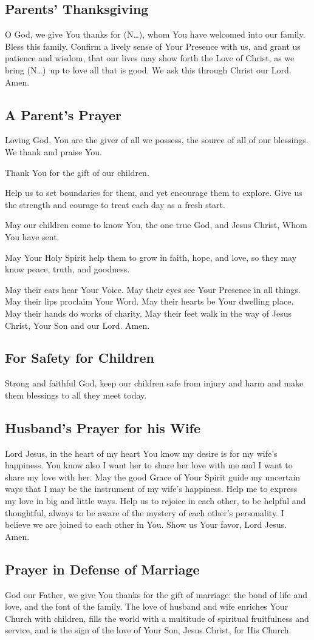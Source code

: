 \documentclass[12pt]{article}
\newcommand{\prayertitle}[1]{\subsection{#1}}
\newcommand{\insertname}{(N\dots)\xspace}
\begin{document}
\prayertitle{Parents' Thanksgiving}
O God, we give You thanks for \insertname, whom You have welcomed into our family.
Bless this family.
Confirm a lively sense of Your Presence with us, and grant us patience and wisdom, that our lives may show forth the Love of Christ, as we bring \insertname\ up to love all that is good.
We ask this through Christ our Lord.
Amen.

\prayertitle{A Parent's Prayer}
\label{prayer:parent}
Loving God, You are the giver of all we possess, the source of all of our blessings.
We thank and praise You.

Thank You for the gift of our children.

Help us to set boundaries for them, and yet encourage them to explore.
Give us the strength and courage to treat each day as a fresh start.

May our children come to know You, the one true God, and Jesus Christ, Whom You have sent.

May Your Holy Spirit help them to grow in faith, hope, and love, so they may know peace, truth, and goodness.

May their ears hear Your Voice.
May their eyes see Your Presence in all things.
May their lips proclaim Your Word.
May their hearts be Your dwelling place.
May their hands do works of charity.
May their feet walk in the way of Jesus Christ, Your Son and our Lord.
Amen.

\prayertitle{For Safety for Children}
\label{prayer:safety_children}
Strong and faithful God, keep our children safe from injury and harm and make them blessings to all they meet today.

\prayertitle{Husband's Prayer for his Wife}
Lord Jesus, in the heart of my heart You know my desire is for my wife's happiness.
You know also I want her to share her love with me and I want to share my love with her.
May the good Grace of Your Spirit guide my uncertain ways that I may be the instrument of my wife's happiness.
Help me to express my love in big and little ways.
Help us to rejoice in each other, to be helpful and thoughtful, always to be aware of the mystery of each other's personality.
I believe we are joined to each other in You.
Show us Your favor, Lord Jesus.
Amen.

\prayertitle{Prayer in Defense of Marriage}
\label{prayer:defense_marriage}
God our Father, we give You thanks for the gift of marriage:
the bond of life and love, and the font of the family. 
The love of husband and wife enriches Your Church with children, fills the world with a multitude of spiritual fruitfulness and service,
and is the sign of the love of Your Son, Jesus Christ, for His Church.
\end{document}

